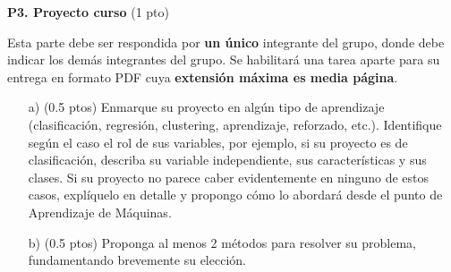 \documentclass[11pt,letterpaper]{article}
\begin{document}
\begin{enumerate}
\end{enumerate}

\noindent\textbf{P3. Proyecto curso} (1 pto)
\vspace{5mm}

Esta parte debe ser respondida por \textbf{un único} integrante del grupo, donde debe indicar los demás integrantes del grupo. Se habilitará una tarea aparte para su entrega en formato PDF cuya \textbf{extensión máxima es media página}.
\begin{itemize}
    \item[a)] (0.5 ptos) Enmarque su proyecto en algún tipo de aprendizaje (clasificación, regresión, clustering, aprendizaje, reforzado, etc.). Identifique según el caso el rol de sus variables, por ejemplo, si su proyecto es de clasificación, describa su variable independiente, sus características y sus clases. Si su proyecto no parece caber evidentemente en ninguno de estos casos, explíquelo en detalle y propongo cómo lo abordará desde el punto de Aprendizaje de Máquinas.
    \item[b)] (0.5 ptos) Proponga al menos 2 métodos para resolver su problema, fundamentando brevemente su elección.
\end{itemize}
\end{document}
